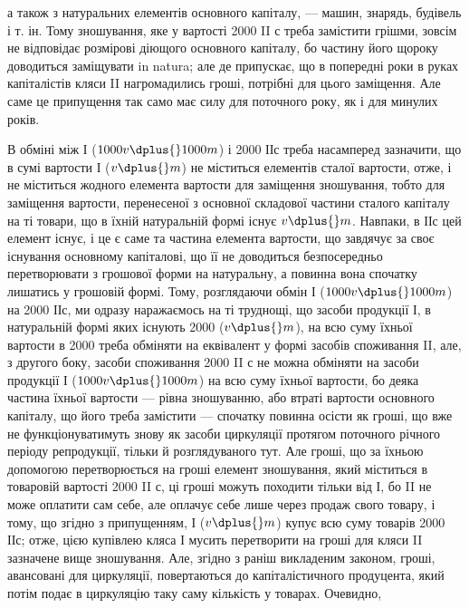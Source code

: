\parcont{}  %
а також з натуральних елементів основного капіталу, — машин,
знарядь, будівель і т. ін. Тому зношування, яке у вартості 2000 II с треба
замістити грішми, зовсім не відповідає розмірові діющого основного
капіталу, бо частину його щороку доводиться заміщувати in natura; але
де припускає, що в попередні роки в руках капіталістів кляси II нагромадились
гроші, потрібні для цього заміщення. Але саме це припущення
так само має силу для поточного року, як і для минулих років.

В обміні між І ($1000 v \dplus{} 1000 m$) і 2000 ІІс треба насамперед зазначити,
що в сумі вартости І ($v \dplus{} m$) не міститься елементів сталої
вартости, отже, і не міститься жодного елемента вартости для заміщення
зношування, тобто для заміщення вартости, перенесеної з основної
складової частини сталого капіталу на ті товари, що в їхній натуральній
формі існує $v \dplus{} m$. Навпаки, в ІІс цей елемент існує, і це є саме та
частина елемента вартости, що завдячує за своє існування основному капіталові,
що її не доводиться безпосередньо перетворювати з грошової
форми на натуральну, а повинна вона спочатку лишатись у грошовій
формі. Тому, розглядаючи обмін І ($1000 v \dplus{} 1000 m$) на 2000 ІІс, ми
одразу наражаємось на ті труднощі, що засоби продукції І, в натуральній
формі яких існують 2000 ($v \dplus{} m$), на всю суму їхньої вартости в
2000 треба обміняти на еквівалент у формі засобів споживання II, але,
з другого боку, засоби споживання 2000 II с не можна обміняти на засоби
продукції І ($1000 v \dplus{} 1000 m$) на всю суму їхньої вартости, бо
деяка частина їхньої вартости — рівна зношуванню, або втраті вартости
основного капіталу, що його треба замістити — спочатку повинна осісти
як гроші, що вже не функціонуватимуть знову як засоби циркуляції
протягом поточного річного періоду репродукції, тільки й розглядуваного
тут. Але гроші, що за їхньою допомогою перетворюється на гроші елемент
зношування, який міститься в товаровій вартості 2000 II с, ці гроші
можуть походити тільки від І, бо II не може оплатити сам себе,
але оплачує себе лише через продаж свого товару, і тому, що згідно
з припущенням, І ($v \dplus{} m$) купує всю суму товарів 2000 ІІс; отже, цією
купівлею кляса І мусить перетворити на гроші для кляси II зазначене
вище зношування. Але, згідно з раніш викладеним законом, гроші, авансовані
для циркуляції, повертаються до капіталістичного продуцента,
який потім подає в циркуляцію таку саму кількість у товарах. Очевидно,
